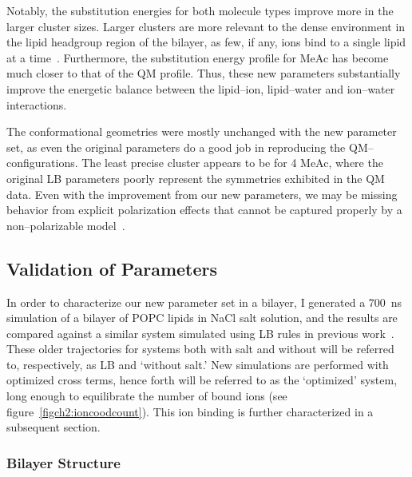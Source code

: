 Notably, the substitution energies for both molecule types improve more in the
larger cluster sizes. Larger clusters are more relevant to the dense
environment in the lipid headgroup region of the bilayer, 
as few, if any, ions bind to a single lipid at a time~\cite{kruczek:2017}. 
Furthermore, the substitution energy profile for MeAc has become much closer to that of the QM profile. 
Thus, these new parameters substantially improve the energetic balance
between the lipid--ion, lipid--water and ion--water interactions.

The conformational geometries were mostly unchanged with the new
parameter set, as even the original parameters do a good job in reproducing the QM--configurations. 
The least precise cluster appears to be for 4 MeAc, 
where the original LB parameters poorly represent the symmetries exhibited in the QM data. 
Even with the improvement from our new parameters, 
we may be missing behavior from explicit polarization effects that
cannot be captured properly by a non--polarizable model~\cite{varma:2010}.

\subsection{Validation of Parameters}

In order to characterize our new parameter set in a bilayer, 
I generated a 700~ns simulation of a bilayer of POPC lipids in NaCl salt solution, 
and the results are compared against a similar system simulated using
LB rules in previous work~\cite{kruczek:2017,kruczek:2019}. 
These older trajectories for systems both with salt and without will be referred to, 
respectively, as  LB and `without salt.'  
New simulations are performed with optimized cross terms, 
hence forth will be referred to as the `optimized' system, 
long enough to equilibrate the number of bound ions (see figure~\ref{figch2:ioncoodcount}). 
This ion binding is further characterized in a subsequent section.

\subsubsection{Bilayer Structure}

